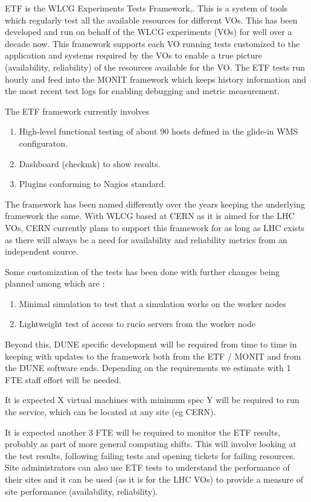 ETF is the WLCG Experiments Tests Framework\cite{bib:ETFDoc},\cite{bib:ETFStatus}. This is a system of tools which regularly test all the available resources for different VOs. This has been developed and run on behalf of the WLCG experiments (VOs) for well over a decade now. This framework supports each VO running tests customized to the application and systems required by the VOs to enable a true picture (availability, reliability) of the resources available for the VO. The ETF tests run hourly and feed into the MONIT framework which keeps history information and the most recent test logs for enabling debugging and metric measurement.

The ETF framework currently involves 
\begin{enumerate}
\item High-level functional testing of about 90 hosts defined in the glide-in WMS configuraton.
\item Dashboard (checkmk) to show results.
\item Plugins conforming to Nagios standard.
\end{enumerate}

The framework has been named differently over the years keeping the underlying framework the same. With WLCG based at CERN as it is aimed for the LHC VOs, CERN currently plans to support this framework for as long as LHC exists as there will always be a need for availability and reliability metrics from an independent source.

Some customization of the tests has been done with further changes being planned among which are :
\begin{enumerate}
    \item Minimal simulation to test that a simulation works on the worker nodes
    \item Lightweight test of access to rucio servers from the worker node
\end{enumerate}

Beyond this, DUNE specific development will be required from time to time in keeping with updates to the framework both from the ETF / MONIT and from the DUNE software ends. Depending on the requirements we estimate  with 1 FTE staff effort will be needed.

It is expected X virtual machines with minimum spec Y will be required to run the service, which can be located at any site (eg CERN).

It is expected another 3 FTE will be required to monitor the ETF results, probably as part of more general computing shifts. This will involve looking at the test results, following failing tests and opening tickets for failing resources. Site administrators can also use ETF tests to understand the performance of their sites and it can be used (as it is for the LHC VOs) to provide a measure of site performance (availability, reliability).

